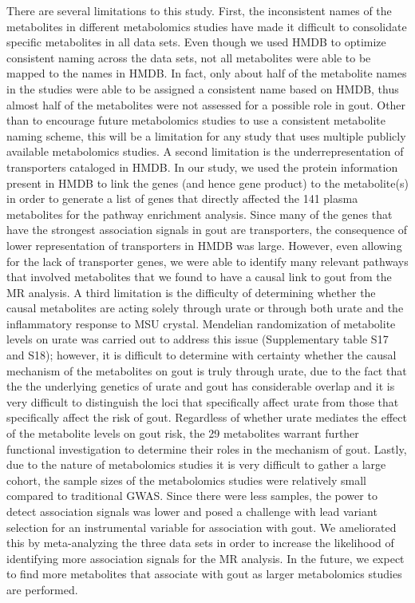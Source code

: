 \documentclass[gucdd,article,submit,pdftex,moreauthors]{Definitions/mdpi}
\begin{document}
There are several limitations to this study.
First, the inconsistent names of the metabolites in different metabolomics studies have made it difficult to consolidate specific metabolites in all data sets.
Even though we used HMDB to optimize consistent naming across the data sets, not all metabolites were able to be mapped to the names in HMDB.
In fact, only about half of the metabolite names in the studies were able to be assigned a consistent name based on HMDB, thus almost half of the metabolites were not assessed for a possible role in gout.
Other than to encourage future metabolomics studies to use a consistent metabolite naming scheme, this will be a limitation for any study that uses multiple publicly available metabolomics studies.
A second limitation is the underrepresentation of transporters cataloged in HMDB.
In our study, we used the protein information present in HMDB to link the genes (and hence gene product) to the metabolite(s) in order to generate a list of genes that directly affected the 141 plasma metabolites for the pathway enrichment analysis.
Since many of the genes that have the strongest association signals in gout are transporters, the consequence of lower representation of transporters in HMDB was large.
However, even allowing for the lack of transporter genes, we were able to identify many relevant pathways that involved metabolites that we found to have a causal link to gout from the MR analysis.
A third limitation is the difficulty of determining whether the causal metabolites are acting solely through urate or through both urate and the inflammatory response to MSU crystal.
Mendelian randomization of metabolite levels on urate was carried out to address this issue (Supplementary table S17 and S18); however, it is difficult to determine with certainty whether the causal mechanism of the metabolites on gout is truly through urate, due to the fact that the the underlying genetics of urate and gout has considerable overlap and it is very difficult to distinguish the loci that specifically affect urate from those that specifically affect the risk of gout.
Regardless of whether urate mediates the effect of the metabolite levels on gout risk, the 29 metabolites warrant further functional investigation to determine their roles in the mechanism of gout.
Lastly, due to the nature of metabolomics studies it is very difficult to gather a large cohort, the sample sizes of the metabolomics studies were relatively small compared to traditional GWAS.
Since there were less samples, the power to detect association signals was lower and posed a challenge with lead variant selection for an instrumental variable for association with gout.
We ameliorated this by meta-analyzing the three data sets in order to increase the likelihood of identifying more association signals for the MR analysis.
In the future, we expect to find more metabolites that associate with gout as larger metabolomics studies are performed.
\end{document}
